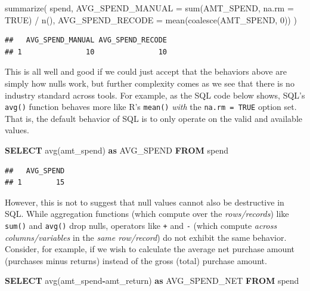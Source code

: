 \documentclass[
]{krantz}
\makeatletter
\newenvironment{Shaded}{\begin{snugshade}}{\end{snugshade}}
\newcommand{\AttributeTok}[1]{\textcolor[rgb]{0.61,0.61,0.61}{#1}}
\newcommand{\ConstantTok}[1]{\textcolor[rgb]{0,0,0}{#1}}
\newcommand{\DecValTok}[1]{\textcolor[rgb]{0.06,0.06,0.06}{#1}}
\newcommand{\FunctionTok}[1]{\textcolor[rgb]{0,0,0}{#1}}
\newcommand{\KeywordTok}[1]{\textcolor[rgb]{0.27,0.27,0.27}{\textbf{#1}}}
\newcommand{\NormalTok}[1]{#1}
\newcommand{\OperatorTok}[1]{\textcolor[rgb]{0.43,0.43,0.43}{\textbf{#1}}}
\newcommand{\SpecialCharTok}[1]{\textcolor[rgb]{0,0,0}{#1}}
\newenvironment{kframe}{%
\medskip{}
\setlength{\fboxsep}{.8em}
 \def\at@end@of@kframe{}%
 \ifinner\ifhmode%
  \def\at@end@of@kframe{\end{minipage}}%
  \begin{minipage}{\columnwidth}%
 \fi\fi%
 \def\FrameCommand##1{\hskip\@totalleftmargin \hskip-\fboxsep
 \colorbox{shadecolor}{##1}\hskip-\fboxsep
     \hskip-\linewidth \hskip-\@totalleftmargin \hskip\columnwidth}%
 \MakeFramed {\advance\hsize-\width
   \@totalleftmargin\z@ \linewidth\hsize
   \@setminipage}}%
 {\par\unskip\endMakeFramed%
 \at@end@of@kframe}
\renewenvironment{Shaded}{\begin{kframe}}{\end{kframe}}
\makeatother
\begin{document}
\begin{Shaded}
\begin{Highlighting}[]
\FunctionTok{summarize}\NormalTok{(}
\NormalTok{    spend,}
    \AttributeTok{AVG\_SPEND\_MANUAL =} \FunctionTok{sum}\NormalTok{(AMT\_SPEND, }\AttributeTok{na.rm =} \ConstantTok{TRUE}\NormalTok{) }\SpecialCharTok{/} \FunctionTok{n}\NormalTok{(),}
    \AttributeTok{AVG\_SPEND\_RECODE =} \FunctionTok{mean}\NormalTok{(}\FunctionTok{coalesce}\NormalTok{(AMT\_SPEND, }\DecValTok{0}\NormalTok{))}
\NormalTok{  )}
\end{Highlighting}
\end{Shaded}

\begin{verbatim}
##   AVG_SPEND_MANUAL AVG_SPEND_RECODE
## 1               10               10
\end{verbatim}

This is all well and good if we could just accept that the behaviors above are simply how nulls work, but further complexity comes as we see that there is no industry standard across tools.
For example, as the SQL code below shows, SQL's \texttt{avg()} function behaves more like R's \texttt{mean()} \emph{with} the \texttt{na.rm\ =\ TRUE} option set.
That is, the default behavior of SQL is to only operate on the valid and available values.

\begin{Shaded}
\begin{Highlighting}[]
\KeywordTok{SELECT} \FunctionTok{avg}\NormalTok{(amt\_spend) }\KeywordTok{as}\NormalTok{ AVG\_SPEND}
\KeywordTok{FROM}\NormalTok{ spend}
\end{Highlighting}
\end{Shaded}

\begin{verbatim}
##   AVG_SPEND
## 1        15
\end{verbatim}

However, this is not to suggest that null values cannot also be destructive in SQL.
While aggregation functions (which compute over the \emph{rows/records}) like \texttt{sum()} and \texttt{avg()} drop nulls, operators like \texttt{+} and \texttt{-} (which compute \emph{across columns/variables} in the \emph{same row/record}) do not exhibit the same behavior.
Consider, for example, if we wish to calculate the average net purchase amount (purchases minus returns) instead of the gross (total) purchase amount.

\begin{Shaded}
\begin{Highlighting}[]
\KeywordTok{SELECT} \FunctionTok{avg}\NormalTok{(amt\_spend}\OperatorTok{{-}}\NormalTok{amt\_return) }\KeywordTok{as}\NormalTok{ AVG\_SPEND\_NET}
\KeywordTok{FROM}\NormalTok{ spend}
\end{Highlighting}
\end{Shaded}
\end{document}
